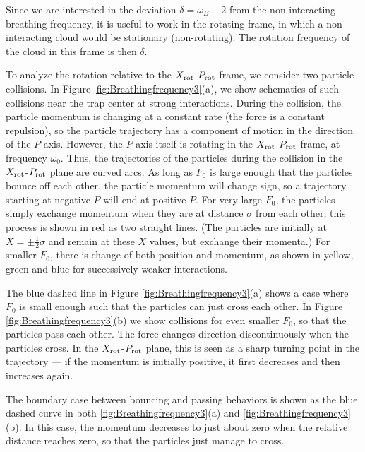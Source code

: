 \documentclass[a4paper, onecolumn]{revtex4-1}
\begin{document}
Since we are interested in the deviation $\delta=\omega_B-2$ from the non-interacting breathing
frequency, it is useful to work in the rotating frame, in which a non-interacting cloud would be
stationary (non-rotating).  The rotation frequency of the cloud in this frame is then $\delta$.

To analyze the rotation relative to the $X_{\rm rot}$-$P_{\rm rot}$ frame, we consider two-particle
collisions.  In Figure \ref{fig:Breathingfrequency3}(a), we show schematics of such collisions near
the trap center at strong interactions.  
%
During the collision, the particle momentum is changing at a constant rate (the force is a constant
repulsion), so the particle trajectory has a component of motion in the direction of the $P$ axis.
However, the $P$ axis itself is rotating in the $X_{\rm rot}$-$P_{\rm rot}$ frame, at frequency
$\omega_0$.  Thus, the trajectories of the particles during the collision in the $X_{\rm
  rot}$-$P_{\rm rot}$ plane are curved arcs.
%
As long as $F_0$ is large enough that the particles bounce off each other, the particle momentum
will change sign, so a trajectory starting at negative $P$ will end at positive $P$.
%
For very large $F_0$, the particles simply exchange momentum when they are at distance $\sigma$ from
each other; this process is shown in red as two straight lines.  (The particles are initially at
$X=\pm\frac{1}{2}\sigma$ and remain at these $X$ values, but exchange their momenta.)  For smaller
$F_0$, there is change of both position and momentum, as shown in yellow, green and blue for
successively weaker interactions.

The blue dashed line in Figure \ref{fig:Breathingfrequency3}(a) shows a case where $F_0$ is small
enough such that the particles can just cross each other.
%
In Figure \ref{fig:Breathingfrequency3}(b) we show collisions for even smaller $F_0$, so that the
particles pass each other.  The force changes direction discontinuously when the particles cross.
In the $X_{\rm rot}$-$P_{\rm rot}$ plane, this is seen as a sharp turning point in the trajectory
--- if the momentum is initially positive, it first decreases and then increases again.

The boundary case between bouncing and passing behaviors is shown as the blue dashed curve in both
\ref{fig:Breathingfrequency3}(a) and \ref{fig:Breathingfrequency3}(b).  In this case, the momentum
decreases to just about zero when the relative distance reaches zero, so that the particles just
manage to cross.  
\end{document}
